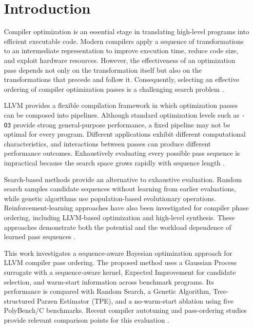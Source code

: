 \section{Introduction}
Compiler optimization is an essential stage in translating high-level programs into efficient executable code. Modern compilers apply a sequence of transformations to an intermediate representation to improve execution time, reduce code size, and exploit hardware resources. However, the effectiveness of an optimization pass depends not only on the transformation itself but also on the transformations that precede and follow it. Consequently, selecting an effective ordering of compiler optimization passes is a challenging search problem \cite{ashouri2018survey,nobre2019nonio,kruse2020autotuning,queiroz2020hybrid,liu2024dco}.

LLVM provides a flexible compilation framework in which optimization passes can be composed into pipelines. Although standard optimization levels such as \texttt{-O3} provide strong general-purpose performance, a fixed pipeline may not be optimal for every program. Different applications exhibit different computational characteristics, and interactions between passes can produce different performance outcomes. Exhaustively evaluating every possible pass sequence is impractical because the search space grows rapidly with sequence length \cite{trofin2021mlgo,cummins2022compilergym,ashouri2024acpo}.

Search-based methods provide an alternative to exhaustive evaluation. Random search samples candidate sequences without learning from earlier evaluations, while genetic algorithms use population-based evolutionary operations. Reinforcement-learning approaches have also been investigated for compiler phase ordering, including LLVM-based optimization and high-level synthesis. These approaches demonstrate both the potential and the workload dependence of learned pass sequences \cite{hajali2020autophase,wu2020roicf,jain2022poset,shahzad2022rl}.

This work investigates a sequence-aware Bayesian optimization approach for LLVM compiler pass ordering. The proposed method uses a Gaussian Process surrogate with a sequence-aware kernel, Expected Improvement for candidate selection, and warm-start information across benchmark programs. Its performance is compared with Random Search, a Genetic Algorithm, Tree-structured Parzen Estimator (TPE), and a no-warm-start ablation using five PolyBench/C benchmarks. Recent compiler autotuning and pass-ordering studies provide relevant comparison points for this evaluation \cite{pouchet2016polybench,wu2022bayesian,liang2023coreset,ashouri2022mlgoperf,chang2023ensemble}.

